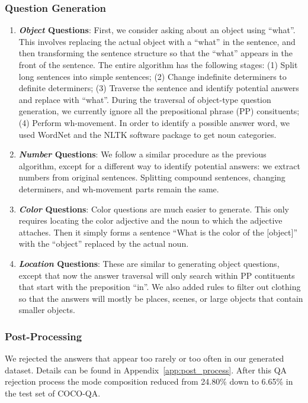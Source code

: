 \documentclass{article} %
\renewcommand{\#}[1]{\textbf{#1}}
\begin{document}
\subsubsection{Question Generation}
\begin{enumerate}[leftmargin=*]
\item \textbf{{\it Object} Questions}:
First, we consider asking about an object using ``what''. This involves 
replacing the actual object with a ``what'' in the sentence, and then 
transforming the sentence structure so that the ``what'' appears in the 
front of the sentence. The entire algorithm has the following stages: (1)
Split long sentences into simple sentences; (2) Change indefinite determiners 
to definite determiners; (3) Traverse the sentence and identify potential answers and replace 
with ``what''. During the traversal of object-type question generation, 
we currently ignore all the prepositional phrase (PP) consituents;
(4) Perform wh-movement.
In order to identify a possible answer word, we used WordNet \cite{wordnet}
and the NLTK software package \cite{nltk} to get noun categories.

\item \textbf{{\it Number} Questions}:
We follow a similar procedure as the 
previous algorithm, except for a different way to identify potential answers:
we extract numbers from original sentences. Splitting 
compound sentences, changing determiners, and wh-movement parts remain the same.

\item \textbf{{\it Color} Questions}:
Color questions are much easier to generate. This only requires locating the 
color adjective and the noun to which the adjective attaches. Then it simply 
forms a sentence ``What is the color of the [object]'' with the ``object'' 
replaced by the actual noun.

\item \textbf{{\it Location} Questions}:
These are similar to generating object questions, except that now the answer
traversal will only search within PP contituents that start with the 
preposition ``in''. We also added rules to filter out clothing so that the 
answers will mostly be places, scenes, or large objects that contain 
smaller objects.
\end{enumerate}

\subsubsection{Post-Processing}
We rejected 
the answers that appear too rarely or too often in our generated
dataset. Details can be found in Appendix~\ref{app:post_process}. After
this QA rejection process the mode composition reduced from 24.80\% 
down to 6.65\% in the test set of COCO-QA. 
\end{document}
